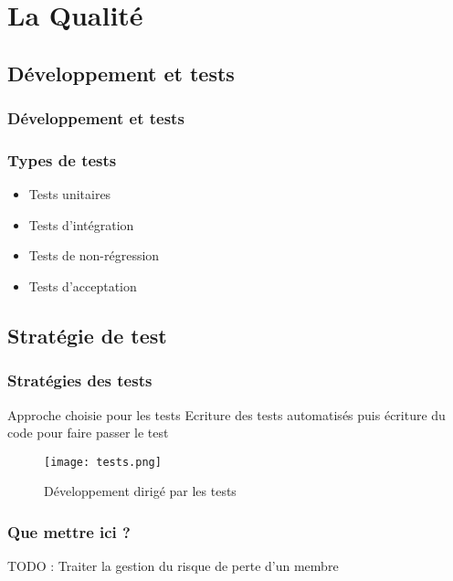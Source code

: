 \section{La Qualité}


\subsection{Développement et tests}

\begin{frame}
  \frametitle{\color{white} Développement et tests}
  \begin{center}
  \end{center}
\end{frame}

\begin{frame}
  \frametitle{\color{white} Types de tests}
  \begin{itemize}
  \item Tests unitaires
  \item Tests d'intégration
  \item Tests de non-régression
  \item Tests d'acceptation
  \end{itemize}
  
  
\end{frame}



\subsection{Stratégie de test}
\begin{frame}
  \frametitle{\color{white} Stratégies des tests}
  \begin{block}{Approche choisie pour les tests}
   Ecriture des tests automatisés puis écriture du code pour faire passer le test
  \end{block}
  \begin{figure}[p]
    \centering
    \texttt{[image: tests.png]}
    \caption{Développement dirigé par les tests}
  \end{figure}
\end{frame}

\begin{frame}
  \frametitle{\color{white} Que mettre ici ?}
  TODO : Traiter la gestion du risque de perte d'un membre

\end{frame}


